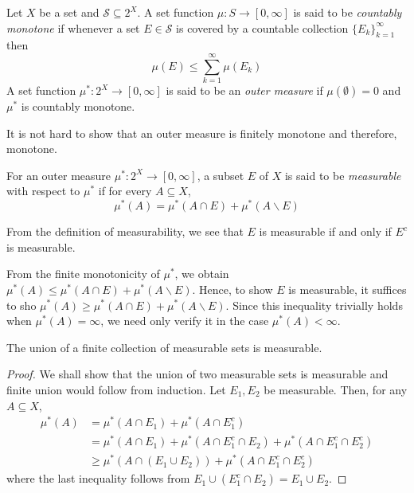 \begin{definition}
    Let $X$ be a set and $\mathcal S\subseteq 2^X$. A set function $\mu: S\to[0,\infty]$ is said to be \textit{countably monotone} if whenever a set $E\in\mathcal S$ is covered by a countable collection $\{E_k\}_{k = 1}^\infty$ then 
    \begin{equation*}
        \mu(E)\le\sum_{k = 1}^\infty\mu(E_k)
    \end{equation*}
    A set function $\mu^*: 2^X\to[0,\infty]$ is said to be an \textit{outer measure} if $\mu(\emptyset) = 0$ and $\mu^*$ is countably monotone.
\end{definition}

It is not hard to show that an outer measure is finitely monotone and therefore, monotone.

\begin{definition}[Measurable]
    For an outer measure $\mu^*: 2^X\to[0,\infty]$, a subset $E$ of $X$ is said to be \textit{measurable} with respect to $\mu^*$ if for every $A\subseteq X$, 
    \begin{equation*}
        \mu^*(A) = \mu^*(A\cap E) + \mu^*(A\backslash E)
    \end{equation*}
\end{definition}

From the definition of measurability, we see that $E$ is measurable if and only if $E^c$ is measurable.

From the finite monotonicity of $\mu^*$, we obtain $\mu^*(A)\le\mu^*(A\cap E) + \mu^*(A\backslash E)$. Hence, to show $E$ is measurable, it suffices to sho $\mu^*(A)\ge\mu^*(A\cap E) + \mu^*(A\backslash E)$. Since this inequality trivially holds when $\mu^*(A) = \infty$, we need only verify it in the case $\mu^*(A) < \infty$.

\begin{proposition}
    The union of a finite collection of measurable sets is measurable.
\end{proposition}
\begin{proof}
    We shall show that the union of two measurable sets is measurable and finite union would follow from induction. Let $E_1,E_2$ be measurable. Then, for any $A\subseteq X$, 
    \begin{align*}
        \mu^*(A) &= \mu^*(A\cap E_1) + \mu^*(A\cap E_1^c)\\
        &=\mu^*(A\cap E_1) + \mu^*(A\cap E_1^c\cap E_2) + \mu^*(A\cap E_1^c\cap E_2^c)\\
        &\ge\mu^*(A\cap(E_1\cup E_2)) + \mu^*(A\cap E_1^c\cap E_2^c)
    \end{align*}
    where the last inequality follows from $E_1\cup(E_1^c\cap E_2) = E_1\cup E_2$.
\end{proof}

